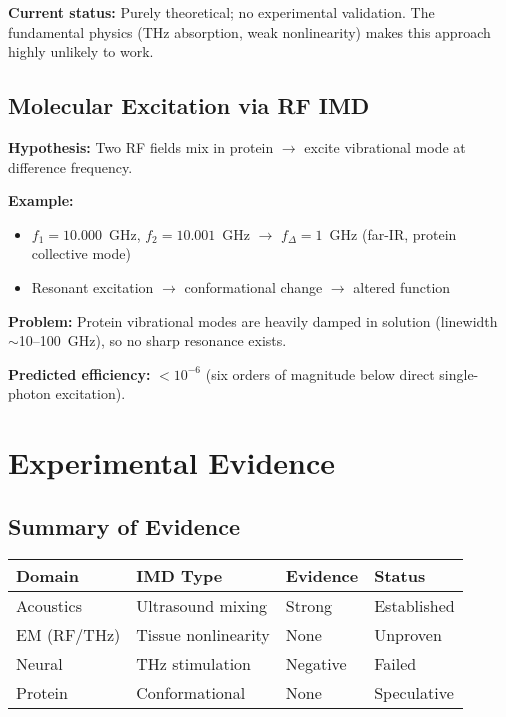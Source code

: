 \begin{warningbox}
\textbf{Current status:} Purely theoretical; no experimental validation. The fundamental physics (THz absorption, weak nonlinearity) makes this approach highly unlikely to work.
\end{warningbox}

\subsection{Molecular Excitation via RF IMD}

\textbf{Hypothesis:} Two RF fields mix in protein $\rightarrow$ excite vibrational mode at difference frequency.

\textbf{Example:}
\begin{itemize}
\item $f_1 = 10.000$~GHz, $f_2 = 10.001$~GHz $\rightarrow$ $f_{\Delta} = 1$~GHz (far-IR, protein collective mode)
\item Resonant excitation $\rightarrow$ conformational change $\rightarrow$ altered function
\end{itemize}

\textbf{Problem:} Protein vibrational modes are heavily damped in solution (linewidth $\sim$10--100~GHz), so no sharp resonance exists.

\textbf{Predicted efficiency:} $<10^{-6}$ (six orders of magnitude below direct single-photon excitation).

\section{Experimental Evidence}

\subsection{Summary of Evidence}

\begin{center}
\begin{tabular}{@{}llll@{}}
\toprule
\textbf{Domain} & \textbf{IMD Type} & \textbf{Evidence} & \textbf{Status} \\
\midrule
Acoustics & Ultrasound mixing & Strong & Established \\
EM (RF/THz) & Tissue nonlinearity & None & Unproven \\
Neural & THz stimulation & Negative & Failed \\
Protein & Conformational & None & Speculative \\
\bottomrule
\end{tabular}
\end{center}

